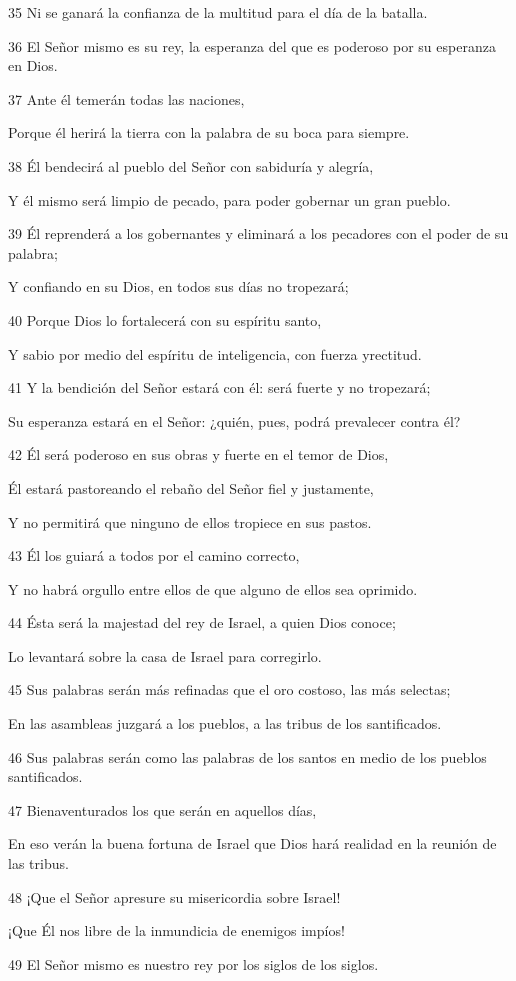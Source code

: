 \par   
\par 35 Ni se ganará la confianza de la multitud para el día de la batalla.
\par 36 El Señor mismo es su rey, la esperanza del que es poderoso por su esperanza en Dios.
\par   
\par 37 Ante él temerán todas las naciones,
\par     Porque él herirá la tierra con la palabra de su boca para siempre.
\par 38 Él bendecirá al pueblo del Señor con sabiduría y alegría,
\par     Y él mismo será limpio de pecado, para poder gobernar un gran pueblo.
\par 39 Él reprenderá a los gobernantes y eliminará a los pecadores con el poder de su palabra;
\par     Y confiando en su Dios, en todos sus días no tropezará;
\par 40 Porque Dios lo fortalecerá con su espíritu santo,
\par     Y sabio por medio del espíritu de inteligencia, con fuerza y ​​rectitud.
\par 41 Y la bendición del Señor estará con él: será fuerte y no tropezará;
\par     Su esperanza estará en el Señor: ¿quién, pues, podrá prevalecer contra él?
\par 42 Él será poderoso en sus obras y fuerte en el temor de Dios,
\par     Él estará pastoreando el rebaño del Señor fiel y justamente,
\par     Y no permitirá que ninguno de ellos tropiece en sus pastos.
\par 43 Él los guiará a todos por el camino correcto,
\par     Y no habrá orgullo entre ellos de que alguno de ellos sea oprimido.
\par 44 Ésta será la majestad del rey de Israel, a quien Dios conoce;
\par     Lo levantará sobre la casa de Israel para corregirlo.
\par 45 Sus palabras serán más refinadas que el oro costoso, las más selectas;
\par     En las asambleas juzgará a los pueblos, a las tribus de los santificados.
\par 46 Sus palabras serán como las palabras de los santos en medio de los pueblos santificados.
\par 47 Bienaventurados los que serán en aquellos días,
\par     En eso verán la buena fortuna de Israel que Dios hará realidad en la reunión de las tribus.
\par 48 ¡Que el Señor apresure su misericordia sobre Israel!
\par     ¡Que Él nos libre de la inmundicia de enemigos impíos!
\par 49 El Señor mismo es nuestro rey por los siglos de los siglos.

